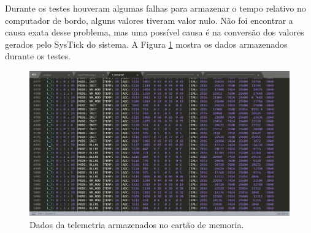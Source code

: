 Durante os testes houveram algumas falhas para armazenar o tempo relativo no computador de bordo, alguns valores tiveram valor nulo. Não foi encontrar a causa exata desse problema, mas uma possível causa é na conversão dos valores gerados pelo SysTick do sistema. A Figura \ref{telemetryData} mostra os dados armazenados durante os testes. 

\begin{figure}[h]
	\centering
	\caption{Dados da telemetria armazenados no cartão de memoria.}
	\includegraphics[keepaspectratio=true,scale=0.48]{figuras/telemetryData.PNG}
	
	\label{telemetryData}
\end{figure}

